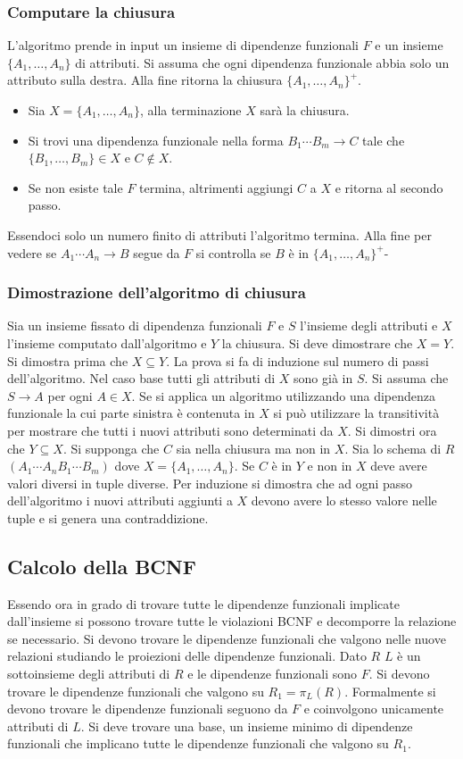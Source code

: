 \subsubsection{Computare la chiusura}
L'algoritmo prende in input un insieme di dipendenze funzionali $F$ e un insieme $\{A_1,\dots, A_n\}$ di attributi. Si assuma che ogni dipendenza funzionale abbia solo un attributo sulla destra. Alla fine ritorna
la chiusura $\{A_1,\dots, A_n\}^+$.
\begin{itemize}
\item Sia $X=\{A_1,\dots, A_n\}$, alla terminazione $X$ sar\`a la chiusura.
\item Si trovi una dipendenza funzionale nella forma $B_1\cdots B_m\rightarrow C$ tale che $\{B_1,\dots, B_m\}\in X$ e  $C\not\in X$. 
\item Se non esiste tale $F$ termina, altrimenti aggiungi $C$ a $X$ e ritorna al secondo passo. 
\end{itemize}
Essendoci solo un numero finito di attributi l'algoritmo termina. Alla fine per vedere se $A_1\cdots A_n\rightarrow B$ segue da $F$ si controlla se $B$ \`e in $\{A_1,\dots, A_n\}^+$-
\subsubsection{Dimostrazione dell'algoritmo di chiusura}
Sia un insieme fissato di dipendenza funzionali $F$ e $S$ l'insieme degli attributi e $X$ l'insieme computato dall'algoritmo e $Y$ la chiusura. Si deve dimostrare che $X=Y$. Si dimostra prima che $X\subseteq 
Y$. La prova si fa di induzione sul numero di passi dell'algoritmo. Nel caso base tutti gli attributi di $X$ sono gi\`a in $S$. Si assuma che $S\rightarrow A$ per ogni $A\in X$. Se si applica un algoritmo utilizzando
una dipendenza funzionale la cui parte sinistra \`e contenuta in $X$ si pu\`o utilizzare la transitivit\`a per mostrare che tutti i nuovi attributi sono determinati da $X$. Si dimostri ora che $Y\subseteq X$. Si
supponga che $C$ sia nella chiusura ma non in $X$. Sia lo schema di $R$ $(A_1\cdots A_nB_1\cdots B_m)$ dove $X=\{A_1,\dots, A_n\}$. Se $C$ \`e in $Y$ e non in $X$ deve avere valori diversi in tuple diverse.
Per induzione si dimostra che ad ogni passo dell'algoritmo i nuovi attributi aggiunti a $X$ devono avere lo stesso valore nelle tuple e si genera una contraddizione.
\subsection{Calcolo della BCNF}
Essendo ora in grado di trovare tutte le dipendenze funzionali implicate dall'insieme si possono trovare tutte le violazioni BCNF e decomporre la relazione se necessario. Si devono trovare le dipendenze 
funzionali che valgono nelle nuove relazioni studiando le proiezioni delle dipendenze funzionali. Dato $R$ $L$ \`e un sottoinsieme degli attributi di $R$ e le dipendenze funzionali sono $F$. Si devono trovare
le dipendenze funzionali che valgono su $R_1=\pi_L(R)$. Formalmente si devono trovare le dipendenze funzionali seguono da $F$ e coinvolgono unicamente attributi di $L$. Si deve trovare una base, un insieme
minimo di dipendenze funzionali che implicano tutte le dipendenze funzionali che valgono su $R_1$. 
